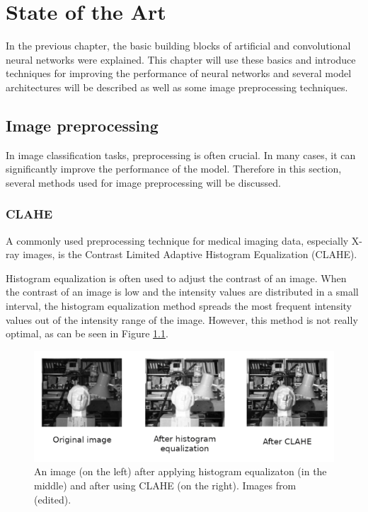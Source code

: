 \documentclass[thesis=B,english]{FITthesis}[2019/12/23]
\begin{document}
\chapter{State of the Art}
\label{chap:state_of_the_art}
In the previous chapter, the basic building blocks of artificial and convolutional neural networks were explained. This chapter will use these basics and introduce techniques for improving the performance of neural networks and several model architectures will be described as well as some image preprocessing techniques.

\section{Image preprocessing}
In image classification tasks, preprocessing is often crucial. In many cases, it can significantly improve the performance of the model. Therefore in this section, several methods used for image preprocessing will be discussed.

\subsection{CLAHE}
A commonly used preprocessing technique for medical imaging data, especially X-ray images, is the Contrast Limited Adaptive Histogram Equalization (CLAHE). 

Histogram equalization is often used to adjust the contrast of an image. When the contrast of an image is low and the intensity values are distributed in a small interval, the histogram equalization method spreads the most frequent intensity values out of the intensity range of the image. However, this method is not really optimal, as can be seen in Figure \ref{fig:hist_eq}.

\begin{figure}[ht]
		\includegraphics[scale=1.3]{images/histogram_eq.png}
		\centering
		\caption{An image (on the left) after applying histogram equalizaton (in the middle) and after using CLAHE (on the right). Images from \cite{opencv_clahe} (edited).}
		\label{fig:hist_eq}
\end{figure}
\end{document}
